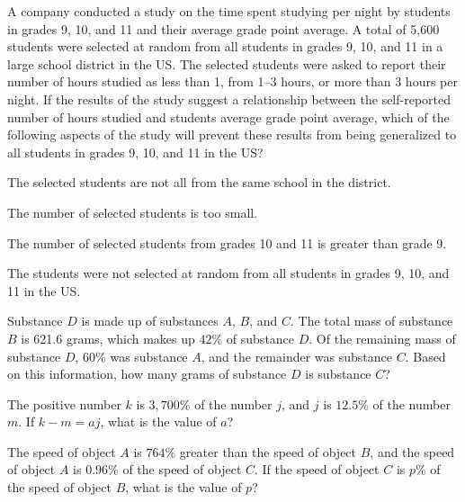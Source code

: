 \noindent\begin{minipage}{\linewidth}
\par\smallskip
A company conducted a study on the time spent studying per night by students in grades 9, 10, and 11 and their average grade point average. A total of 5,600 students were selected at random from all students in grades 9, 10, and 11 in a large school district in the US. The selected students were asked to report their number of hours studied as less than 1, from 1--3 hours, or more than 3 hours per night. If the results of the study suggest a relationship between the self-reported number of hours studied and students average grade point average, which of the following aspects of the study will prevent these results from being generalized to all students in grades 9, 10, and 11 in the US?
\begin{satchoices}
  \item[A)] The selected students are not all from the same school in the district.
  \item[B)] The number of selected students is too small.
  \item[C)] The number of selected students from grades 10 and 11 is greater than grade 9.
  \item[D)] The students were not selected at random from all students in grades 9, 10, and 11 in the US.
\end{satchoices}
\end{minipage}
\vfill
\noindent\begin{minipage}{\linewidth}
\par\smallskip
Substance $D$ is made up of substances $A$, $B$, and $C$. The total mass of substance $B$ is 621.6 grams, which makes up $42\%$ of substance $D$. Of the remaining mass of substance $D$, $60\%$ was substance $A$, and the remainder was substance $C$. Based on this information, how many grams of substance $D$ is substance $C$?
\end{minipage}
\vfill
\noindent\begin{minipage}{\linewidth}
\par\smallskip
The positive number $k$ is $3{,}700\%$ of the number $j$, and $j$ is $12.5\%$ of the number $m$. If $k-m=aj$, what is the value of $a$?
\end{minipage}
\vfill
\clearpage
\noindent\begin{minipage}{\linewidth}
\par\smallskip
The speed of object $A$ is $764\%$ greater than the speed of object $B$, and the speed of object $A$ is $0.96\%$ of the speed of object $C$. If the speed of object $C$ is $p\%$ of the speed of object $B$, what is the value of $p$?
\end{minipage}
